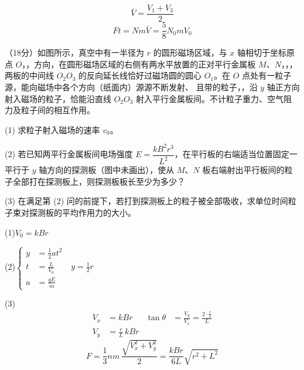 \[ \bar V=\frac{V_1+V_3}{2} \]
\[ Ft=Nm\bar V=\frac58N_0mV_0 \]
\begin{problem}
（18分）如图所示，真空中有一半径为 $r$ 的圆形磁场区域，与 $x$ 轴相切于坐标原点 $O$，，方向，在圆形磁场区域的右侧有两水平放置的正对平行金属板 $M$、$N$，，，两板的中间线 $O_2O_3$ 的反向延长线恰好过磁场圆的圆心 $O_1$。在 $O$ 点处有一粒子源，能向磁场中各个方向（纸面内）源源不断发射、 且带的粒子，，沿 $y$ 轴正方向射入磁场的粒子，恰能沿直线 $O_2O_3$ 射入平行金属板间。不计粒子重力、空气阻力及粒子间的相互作用。

(1) 求粒子射入磁场的速率 $v_0$。

(2) 若已知两平行金属板间电场强度 $E=\dfrac{kB^2r^3}{L^2}$，在平行板的右端适当位置固定一平行于 $y$ 轴方向的探测板（图中未画出），使从 $M$、$N$ 板右端射出平行板间的粒子全部打在探测板上，则探测板板长至少为多少？

(3) 在满足第 (2) 问的前提下，若打到探测板上的粒子被全部吸收，求单位时间粒子束对探测板的平均作用力的大小。

\begin{solution}
(1)\quad $V_0=kBr$

(2)\quad $\left\{\begin{aligned} y&=\tfrac12at^2\\ t&=\tfrac{L}{V_0}\qquad y=\tfrac12r\\ a&=\tfrac{qE}{m}\end{aligned}\right.$

(3)
\begin{align*}
V_x&=kBr & \tan\theta&=\frac{V_y}{V_x}=\frac{2\cdot\frac{r}{2}}{L}\\
V_y&=\frac{r}{L}\,kBr
\end{align*}
\[ F=\frac13nm\,\frac{\sqrt{V_x^2+V_y^2}}{2}=\frac{kBr}{6L}\sqrt{r^2+L^2} \]
\end{solution}
\end{problem}
